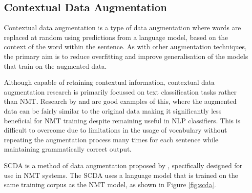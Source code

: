 



\subsection{Contextual Data Augmentation}

Contextual data augmentation is a type of data augmentation where words are replaced at random using predictions from a language model, based on the context of the word within the sentence. As with other augmentation techniques, the primary aim is to reduce overfitting and improve generalisation of the models that train on the augmented data. 

Although capable of retaining contextual information, contextual data augmentation research is primarily focussed on text classification tasks rather than \acrshort{NMT}. Research by \cite{wu_conditional_2018} and \cite{kobayashi_contextual_2018} are good examples of this, where the augmented data can be fairly similar to the original data making it significantly less beneficial for \acrshort{NMT} training despite remaining useful in \acrshort{NLP} classifiers. This is difficult to overcome due to limitations in the usage of vocabulary without repeating the augmentation process many times for each sentence while maintaining grammatically correct output.

\acrfull{SCDA} is a method of data augmentation proposed by \cite{zhu_soft_2019}, specifically designed for use in \acrshort{NMT} systems. The \acrshort{SCDA} uses a language model that is trained on the same training corpus as the \acrshort{NMT} model, as shown in Figure \ref{fig:scda}.

